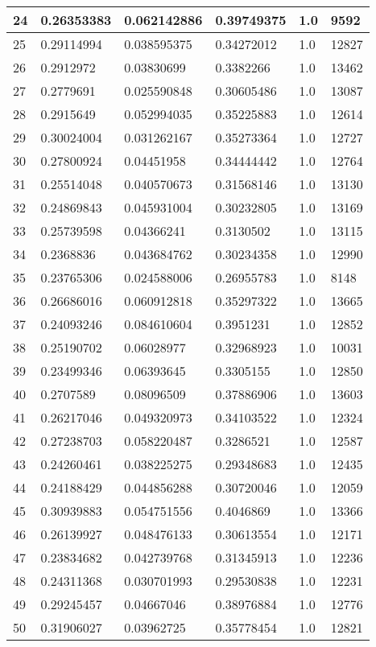 \begin{longtable}{|l|l|l|l|l|l|}
24 & 0.26353383 & 0.062142886 & 0.39749375 & 1.0 & 9592 \\ \hline 
25 & 0.29114994 & 0.038595375 & 0.34272012 & 1.0 & 12827 \\ \hline 
26 & 0.2912972 & 0.03830699 & 0.3382266 & 1.0 & 13462 \\ \hline 
27 & 0.2779691 & 0.025590848 & 0.30605486 & 1.0 & 13087 \\ \hline 
28 & 0.2915649 & 0.052994035 & 0.35225883 & 1.0 & 12614 \\ \hline 
29 & 0.30024004 & 0.031262167 & 0.35273364 & 1.0 & 12727 \\ \hline 
30 & 0.27800924 & 0.04451958 & 0.34444442 & 1.0 & 12764 \\ \hline 
31 & 0.25514048 & 0.040570673 & 0.31568146 & 1.0 & 13130 \\ \hline 
32 & 0.24869843 & 0.045931004 & 0.30232805 & 1.0 & 13169 \\ \hline 
33 & 0.25739598 & 0.04366241 & 0.3130502 & 1.0 & 13115 \\ \hline 
34 & 0.2368836 & 0.043684762 & 0.30234358 & 1.0 & 12990 \\ \hline 
35 & 0.23765306 & 0.024588006 & 0.26955783 & 1.0 & 8148 \\ \hline 
36 & 0.26686016 & 0.060912818 & 0.35297322 & 1.0 & 13665 \\ \hline 
37 & 0.24093246 & 0.084610604 & 0.3951231 & 1.0 & 12852 \\ \hline 
38 & 0.25190702 & 0.06028977 & 0.32968923 & 1.0 & 10031 \\ \hline 
39 & 0.23499346 & 0.06393645 & 0.3305155 & 1.0 & 12850 \\ \hline 
40 & 0.2707589 & 0.08096509 & 0.37886906 & 1.0 & 13603 \\ \hline 
41 & 0.26217046 & 0.049320973 & 0.34103522 & 1.0 & 12324 \\ \hline 
42 & 0.27238703 & 0.058220487 & 0.3286521 & 1.0 & 12587 \\ \hline 
43 & 0.24260461 & 0.038225275 & 0.29348683 & 1.0 & 12435 \\ \hline 
44 & 0.24188429 & 0.044856288 & 0.30720046 & 1.0 & 12059 \\ \hline 
45 & 0.30939883 & 0.054751556 & 0.4046869 & 1.0 & 13366 \\ \hline 
46 & 0.26139927 & 0.048476133 & 0.30613554 & 1.0 & 12171 \\ \hline 
47 & 0.23834682 & 0.042739768 & 0.31345913 & 1.0 & 12236 \\ \hline 
48 & 0.24311368 & 0.030701993 & 0.29530838 & 1.0 & 12231 \\ \hline 
49 & 0.29245457 & 0.04667046 & 0.38976884 & 1.0 & 12776 \\ \hline 
50 & 0.31906027 & 0.03962725 & 0.35778454 & 1.0 & 12821 \\ \hline 
\end{longtable}